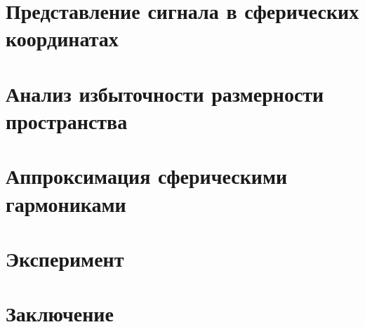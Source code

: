 \documentclass[12pt,twoside]{article}
\begin{document}
\section{Представление сигнала в сферических координатах}
\section{Анализ избыточности размерности пространства}
\section{Аппроксимация сферическими гармониками}
\section{Эксперимент}
\section{Заключение}
\newpage


\end{document}
